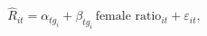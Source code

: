\begin{equation}\label{equation14}
	\widehat R_{it} = \alpha_{tg_i} + \beta_{tg_i}\,\text{female ratio}_{it} + \varepsilon_{it},
\end{equation}